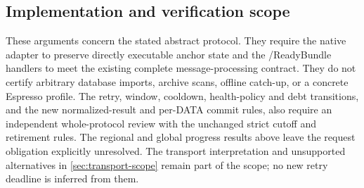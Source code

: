 \subsection{Implementation and verification scope}
\label{sec:v35-progress-scope}
These arguments concern the stated abstract protocol. They require the
native adapter to preserve directly executable anchor state and the
/ReadyBundle handlers to meet the existing complete
message-processing contract. They do not certify arbitrary database
imports, archive scans, offline catch-up, or a concrete Espresso profile.
The retry, window, cooldown, health-policy and debt transitions, and
the new normalized-result and per-DATA commit rules, also
require an independent whole-protocol review with the unchanged strict
cutoff and retirement rules. The regional and global progress results
above leave the request obligation explicitly unresolved. The transport
interpretation and unsupported alternatives in \cref{sec:transport-scope}
remain part of the scope; no new retry deadline is inferred from them.
